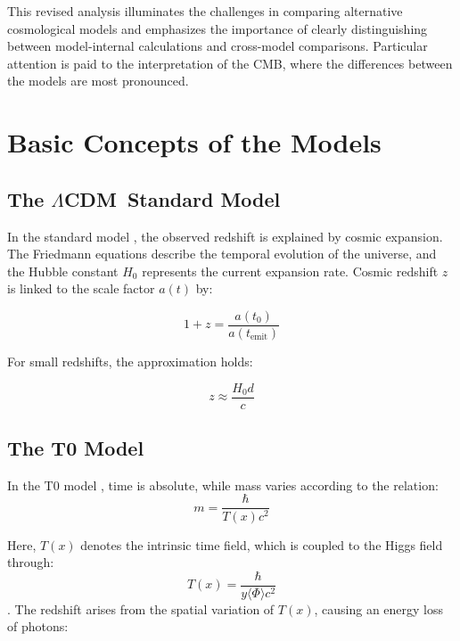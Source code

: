 \documentclass[a4paper,12pt]{article}
\newcommand{\LCDM}{\ensuremath{\Lambda}CDM}
\begin{document}
	This revised analysis illuminates the challenges in comparing alternative cosmological models and emphasizes the importance of clearly distinguishing between model-internal calculations and cross-model comparisons. Particular attention is paid to the interpretation of the CMB, where the differences between the models are most pronounced.
	
	\section{Basic Concepts of the Models}
	
	\subsection{The \LCDM\ Standard Model}
	
	In the standard model \cite{Planck2018}, the observed redshift is explained by cosmic expansion. The Friedmann equations describe the temporal evolution of the universe, and the Hubble constant \( H_0 \) represents the current expansion rate. Cosmic redshift \( z \) is linked to the scale factor \( a(t) \) by:
	
	\begin{equation}
		1 + z = \frac{a(t_0)}{a(t_{\text{emit}})}
	\end{equation}
	
	For small redshifts, the approximation holds:
	
	\begin{equation}
		z \approx \frac{H_0 d}{c}
	\end{equation}
	
	\subsection{The T0 Model}
	
	In the T0 model \cite{Pascher2025e}, time is absolute, while mass varies according to the relation:
	\begin{equation}
		m = \frac{\hbar}{T(x) c^2}
	\end{equation}
	
	Here, \( T(x) \) denotes the intrinsic time field, which is coupled to the Higgs field through:
	\begin{equation}
		T(x) = \frac{\hbar}{y \langle \Phi \rangle c^2}
	\end{equation}
	\cite{Pascher2025b}. The redshift arises from the spatial variation of \( T(x) \), causing an energy loss of photons:
	
\end{document}
